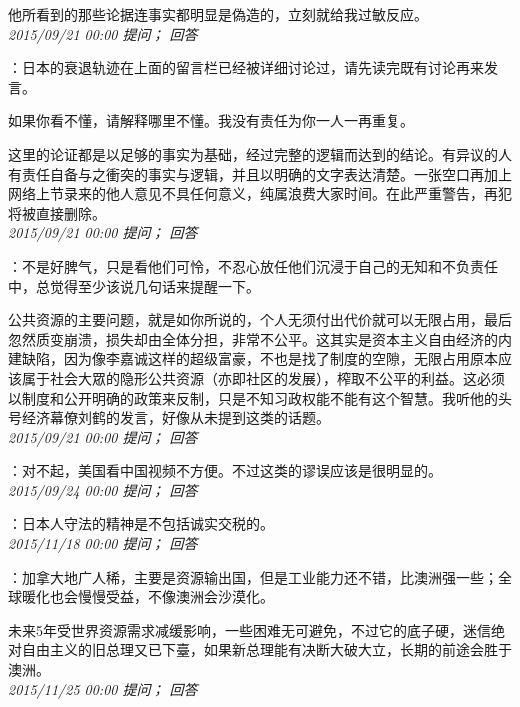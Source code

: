 \documentclass[twocolumn]{ctexart}
\begin{document}
他所看到的那些论据连事实都明显是偽造的，立刻就给我过敏反应。\\

\textit{\hfill\noindent\small 2015/09/21 00:00 提问； 回答}

：日本的衰退轨迹在上面的留言栏已经被详细讨论过，请先读完既有讨论再来发言。

如果你看不懂，请解释哪里不懂。我没有责任为你一人一再重复。

这里的论证都是以足够的事实为基础，经过完整的逻辑而达到的结论。有异议的人有责任自备与之衝突的事实与逻辑，并且以明确的文字表达清楚。一张空口再加上网络上节录来的他人意见不具任何意义，纯属浪费大家时间。在此严重警告，再犯将被直接删除。\\

\textit{\hfill\noindent\small 2015/09/21 00:00 提问； 回答}

：不是好脾气，只是看他们可怜，不忍心放任他们沉浸于自己的无知和不负责任中，总觉得至少该说几句话来提醒一下。

公共资源的主要问题，就是如你所说的，个人无须付出代价就可以无限占用，最后忽然质变崩溃，损失却由全体分担，非常不公平。这其实是资本主义自由经济的内建缺陷，因为像李嘉诚这样的超级富豪，不也是找了制度的空隙，无限占用原本应该属于社会大眾的隐形公共资源（亦即社区的发展），榨取不公平的利益。这必须以制度和公开明确的政策来反制，只是不知习政权能不能有这个智慧。我听他的头号经济幕僚刘鹤的发言，好像从未提到这类的话题。\\

\textit{\hfill\noindent\small 2015/09/21 00:00 提问； 回答}

：对不起，美国看中国视频不方便。不过这类的谬误应该是很明显的。\\

\textit{\hfill\noindent\small 2015/09/24 00:00 提问； 回答}

：日本人守法的精神是不包括诚实交税的。\\

\textit{\hfill\noindent\small 2015/11/18 00:00 提问； 回答}

：加拿大地广人稀，主要是资源输出国，但是工业能力还不错，比澳洲强一些；全球暖化也会慢慢受益，不像澳洲会沙漠化。

未来5年受世界资源需求减缓影响，一些困难无可避免，不过它的底子硬，迷信绝对自由主义的旧总理又已下臺，如果新总理能有决断大破大立，长期的前途会胜于澳洲。\\

\textit{\hfill\noindent\small 2015/11/25 00:00 提问； 回答}
\end{document}
